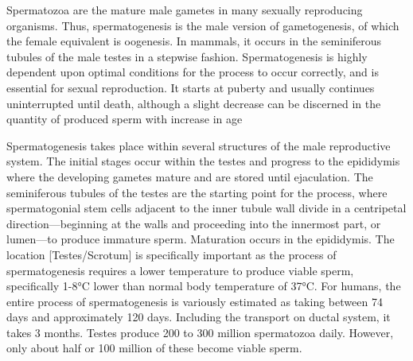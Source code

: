 Spermatozoa are the mature male gametes in many sexually reproducing
organisms. Thus, spermatogenesis is the male version of gametogenesis,
of which the female equivalent is oogenesis. In mammals, it occurs in
the seminiferous tubules of the male testes in a stepwise fashion.
Spermatogenesis is highly dependent upon optimal conditions for the
process to occur correctly, and is essential for sexual reproduction. It
starts at puberty and usually continues uninterrupted until death,
although a slight decrease can be discerned in the quantity of produced
sperm with increase in age

Spermatogenesis takes place within several structures of the male
reproductive system. The initial stages occur within the testes and
progress to the epididymis where the developing gametes mature and are
stored until ejaculation. The seminiferous tubules of the testes are the
starting point for the process, where spermatogonial stem cells adjacent
to the inner tubule wall divide in a centripetal direction---beginning
at the walls and proceeding into the innermost part, or lumen---to
produce immature sperm. Maturation occurs in the epididymis. The
location {[}Testes/Scrotum{]} is specifically important as the process
of spermatogenesis requires a lower temperature to produce viable sperm,
specifically 1-8°C lower than normal body temperature of 37°C. For
humans, the entire process of spermatogenesis is variously estimated as
taking between 74 days and approximately 120 days. Including the
transport on ductal system, it takes 3 months. Testes produce 200 to 300
million spermatozoa daily. However, only about half or 100 million of
these become viable sperm.


